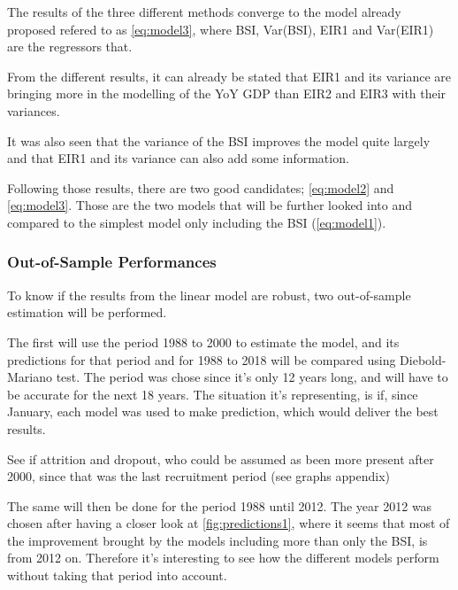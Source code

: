 \documentclass[12pt,a4paper,oneside]{book}
\begin{document}
The results of the three different methods converge to the model already proposed refered to as \ref{eq:model3}, where BSI, Var(BSI), EIR1 and Var(EIR1) are the regressors that.

From the different results, it can already be stated that EIR1 and its variance are bringing more in the modelling of the YoY GDP than EIR2 and EIR3 with their variances.

It was also seen that the variance of the BSI improves the model quite largely and that EIR1 and its variance can also add some information.

Following those results, there are two good candidates; \autoref{eq:model2} and \ref{eq:model3}. Those are the two models that will be further looked into and compared to the simplest model only including the BSI (\autoref{eq:model1}).



\subsubsection{Out-of-Sample Performances}

To know if the results from the linear model are robust, two out-of-sample estimation will be performed.

The first will use the period 1988 to 2000 to estimate the model, and its predictions for that period and for 1988 to 2018 will be compared using Diebold-Mariano test.
The period was chose since it's only 12 years long, and will have to be accurate for the next 18 years. The situation it's representing, is if, since January, each model was used to make prediction, which would deliver the best results.

See if attrition and dropout, who could be assumed as been more present after 2000, since that was the last recruitment period (see graphs appendix)

The same will then be done for the period 1988 until 2012. The year 2012 was chosen after having a closer look at \autoref{fig:predictions1}, where it seems that most of the improvement brought by the models including more than only the BSI, is from 2012 on. Therefore it's interesting to see how the different models perform without taking that period into account.

\end{document}
